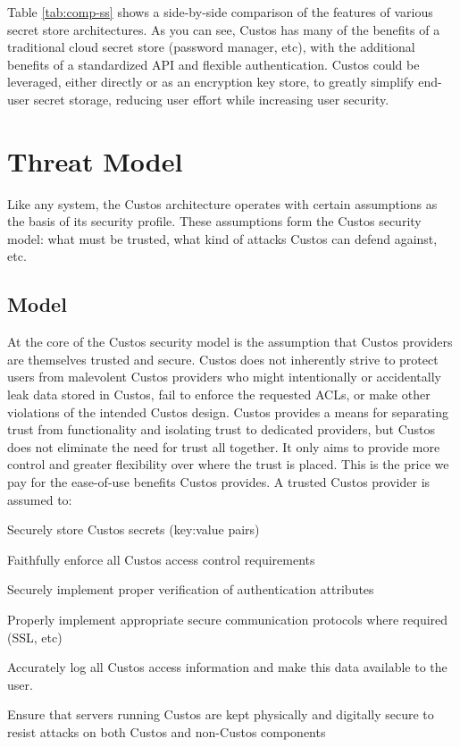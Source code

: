 Table \ref{tab:comp-ss} shows a side-by-side comparison of the
features of various secret store architectures. As you can see, Custos
has many of the benefits of a traditional cloud secret store (password
manager, etc), with the additional benefits of a standardized API and
flexible authentication. Custos could be leveraged, either directly or
as an encryption key store, to greatly simplify end-user secret
storage, reducing user effort while increasing user security.

\section{Threat Model}

Like any system, the Custos architecture operates with certain
assumptions as the basis of its security profile. These assumptions
form the Custos security model: what must be trusted, what kind of
attacks Custos can defend against, etc.

\subsection{Model}

At the core of the Custos security model is the assumption that Custos
providers are themselves trusted and secure. Custos does not
inherently strive to protect users from malevolent Custos providers
who might intentionally or accidentally leak data stored in Custos,
fail to enforce the requested ACLs, or make other violations of the
intended Custos design. Custos provides a means for separating trust
from functionality and isolating trust to dedicated providers, but
Custos does not eliminate the need for trust all together. It only
aims to provide more control and greater flexibility over where the
trust is placed. This is the price we pay for the ease-of-use benefits
Custos provides. A trusted Custos provider is assumed to:

\begin{packed_item}
\item Securely store Custos secrets (key:value pairs)
\item Faithfully enforce all Custos access control requirements
\item Securely implement proper verification of authentication attributes
\item Properly implement appropriate secure communication protocols where
  required (SSL, etc)
\item Accurately log all Custos access information and make this data
  available to the user.
\item Ensure that servers running Custos are kept physically and
  digitally secure to resist attacks on both Custos and non-Custos
  components
\end{packed_item}

